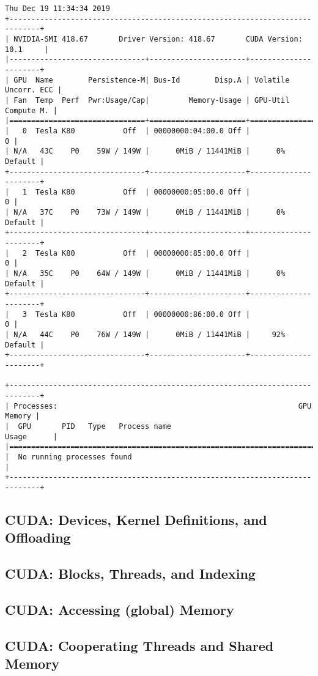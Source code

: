 \begin{lstlisting}[caption={Output of runing \texttt{nvidia-smi} in the cluster.}]
Thu Dec 19 11:34:34 2019       
+-----------------------------------------------------------------------------+
| NVIDIA-SMI 418.67       Driver Version: 418.67       CUDA Version: 10.1     |
|-------------------------------+----------------------+----------------------+
| GPU  Name        Persistence-M| Bus-Id        Disp.A | Volatile Uncorr. ECC |
| Fan  Temp  Perf  Pwr:Usage/Cap|         Memory-Usage | GPU-Util  Compute M. |
|===============================+======================+======================|
|   0  Tesla K80           Off  | 00000000:04:00.0 Off |                    0 |
| N/A   43C    P0    59W / 149W |      0MiB / 11441MiB |      0%      Default |
+-------------------------------+----------------------+----------------------+
|   1  Tesla K80           Off  | 00000000:05:00.0 Off |                    0 |
| N/A   37C    P0    73W / 149W |      0MiB / 11441MiB |      0%      Default |
+-------------------------------+----------------------+----------------------+
|   2  Tesla K80           Off  | 00000000:85:00.0 Off |                    0 |
| N/A   35C    P0    64W / 149W |      0MiB / 11441MiB |      0%      Default |
+-------------------------------+----------------------+----------------------+
|   3  Tesla K80           Off  | 00000000:86:00.0 Off |                    0 |
| N/A   44C    P0    76W / 149W |      0MiB / 11441MiB |     92%      Default |
+-------------------------------+----------------------+----------------------+
                                                                               
+-----------------------------------------------------------------------------+
| Processes:                                                       GPU Memory |
|  GPU       PID   Type   Process name                             Usage      |
|=============================================================================|
|  No running processes found                                                 |
+-----------------------------------------------------------------------------+
\end{lstlisting}


\subsection{CUDA: Devices, Kernel Definitions, and Offloading}

\subsection{CUDA: Blocks, Threads, and Indexing}

\subsection{CUDA: Accessing (global) Memory}

\subsection{CUDA: Cooperating Threads and Shared Memory}
